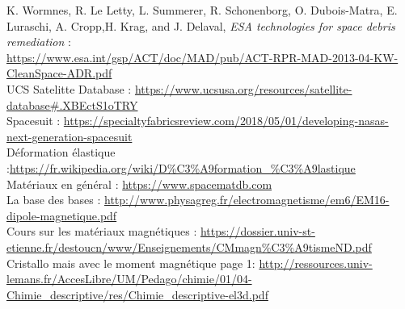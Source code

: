 \documentclass[a4paper,1pt]{article}
\begin{document}
\begin{thebibliography}{11}
	K. Wormnes, R. Le Letty, L. Summerer, R. Schonenborg, O. Dubois-Matra, E. Luraschi, A. Cropp,H. Krag, and J. Delaval, \textit{ESA technologies for space debris remediation} :\\
	\url{https://www.esa.int/gsp/ACT/doc/MAD/pub/ACT-RPR-MAD-2013-04-KW-CleanSpace-ADR.pdf}\\
	
	UCS Satelitte Database : \url{https://www.ucsusa.org/resources/satellite-database#.XBEctS1oTRY}\\

	Spacesuit : \url{https://specialtyfabricsreview.com/2018/05/01/developing-nasas-next-generation-spacesuit}\\
	
	Déformation élastique :\url{https://fr.wikipedia.org/wiki/D%C3%A9formation_%C3%A9lastique}\\

	Matériaux en général : \url{https://www.spacematdb.com}\\
	La base des bases  : \url{http://www.physagreg.fr/electromagnetisme/em6/EM16-dipole-magnetique.pdf}\\
	Cours sur les matériaux magnétiques : \url{https://dossier.univ-st-etienne.fr/destoucn/www/Enseignements/CMmagn%C3%A9tismeND.pdf}\\
	Cristallo mais avec le moment magnétique page 1: \url{http://ressources.univ-lemans.fr/AccesLibre/UM/Pedago/chimie/01/04-Chimie_descriptive/res/Chimie_descriptive-el3d.pdf}\\
\end{thebibliography}
\end{document}
